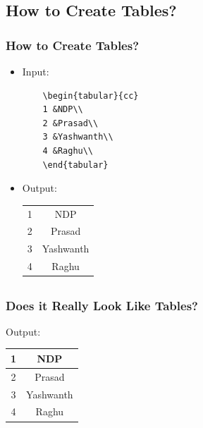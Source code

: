 \documentclass[12pt]{beamer}
\begin{document}
\begin{frame}[fragile]
\section{    How to Create Tables?     }
\frametitle{How to Create Tables?}
\begin{itemize}
	\item Input:
	\begin{verbatim}
	\begin{tabular}{cc}
	1 &NDP\\
	2 &Prasad\\
	3 &Yashwanth\\
	4 &Raghu\\
	\end{tabular}
	\end{verbatim}
	\item Output:\\
		\begin{tabular}{cc}
			1 &NDP\\
		2 &Prasad\\
		3 &Yashwanth\\
		4 &Raghu\\
	\end{tabular}
\end{itemize}

\end{frame}
\begin{frame}
\section{         }
\frametitle{Does it Really Look Like Tables?}
Output:
\begin{center}
	\begin{tabular}{|c|c|}
		\hline
				1 &NDP\\		\hline
			2 &Prasad\\		\hline
			3 &Yashwanth\\		\hline
			4 &Raghu\\
			\hline
\end{tabular}
\end{center}
\end{frame}
\end{document}
